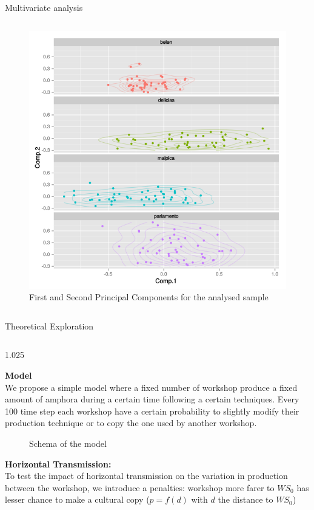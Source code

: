\documentclass[final]{beamer}
\newlength{\onecolwid}
\newlength{\twocolwid}
\begin{document}
\begin{frame}[t]
\begin{columns}[t]
\begin{column}{\twocolwid}
\begin{block}{Multivariate analysis}
\begin{columns}[t,totalwidth=\twocolwid]
\begin{column}{\onecolwid} %


\begin{figure}
\includegraphics[width=0.6\linewidth]{images/fig2.png}
\caption{First and Second Principal Components for the analysed sample}
\label{fig:pca}
\end{figure}

\end{column}
\end{columns}

\end{block}

\begin{block}{Theoretical Exploration}

\begin{columns}[t,totalwidth=\twocolwid]

\begin{column}{1.025\onecolwid} %

{\textbf{Model}}\\
\justify
We propose a simple model where a fixed number of workshop produce a fixed amount of amphora during a certain time following a certain techniques. Every 100 time step each workshop have a certain probability to slightly modify their production technique or to copy the one used by another workshop. 
\begin{figure}
	    \centering
    
    \caption{Schema of the model}
    \label{fig:mod}
\end{figure}

{\textbf{Horizontal Transmission:}}\\
To test the impact of horizontal transmission on the variation in production between the workshop, we introduce a penalties: workshop more farer to $WS_0$ has lesser chance to make a cultural copy ($p=f(d)$ with $d$ the distance to $WS_0$)



\end{column}
\end{columns}
\end{block}
\end{column}
\end{columns}
\end{frame}
\end{document}
